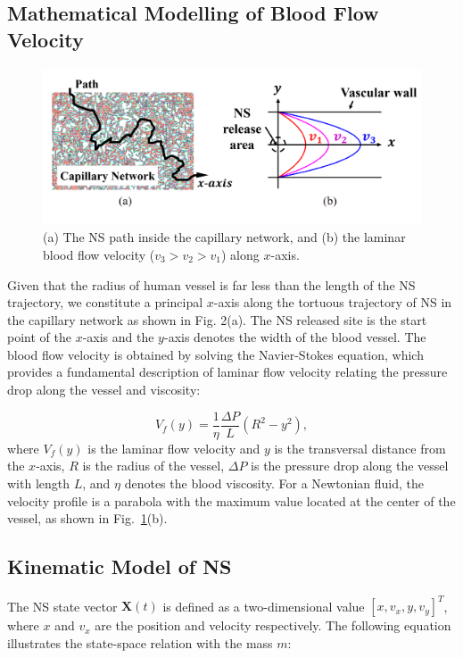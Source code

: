 \documentclass[conference]{IEEEtran}
\begin{document}
\subsection {Mathematical Modelling of Blood Flow Velocity}

\begin{figure}
\centering
\includegraphics[width=9 cm]{fig2.png}
\caption{(a) The NS path inside the capillary network, and (b) the laminar blood flow velocity ($v_{3}>v_{2}>v_{1}$) along $x$-axis.}
\label{fig2}
\end{figure}



Given that the radius of human vessel is far less than the length of the NS trajectory, we constitute a principal $x$-axis along the tortuous trajectory of NS in the capillary network as shown in Fig. 2(a). The NS released site is the start point of the $x$-axis and the $y$-axis denotes the width of the blood vessel. The blood flow velocity is obtained by solving the Navier-Stokes equation, which provides a fundamental description of laminar flow velocity relating the pressure drop along the vessel and viscosity:

\begin{equation}
  V_f(y) = {\frac{1}{\eta}}{\frac{\Delta P}{L}}(R^{2}-y^{2}),
\label{eq1}
\end{equation}
where $V_f(y)$ is the laminar flow velocity and $y$ is the transversal distance from the $x$-axis, $R$ is the radius of the vessel, $\Delta P$ is the pressure drop along the vessel with length $L$, and $\eta$ denotes the blood viscosity. For a Newtonian fluid, the velocity profile is a parabola with the maximum value located at the center of the vessel, as shown in Fig.~\ref{fig2}(b).


\subsection {Kinematic Model of NS}
The NS state vector $\textbf{X}(t)$ is defined as a two-dimensional value $\left[ x,v_x,y,v_y \right]^{T} $, where $x$ and $v_x$ are the position and velocity respectively. The following equation illustrates the state-space relation with the mass $m$:
\end{document}
